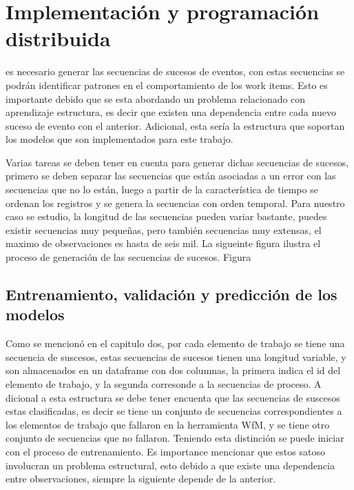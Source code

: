 
\chapter{Implementación y programación distribuida}

\ifpdf
    \graphicspath{{Chapter4/Figs/Raster/}{Chapter4/Figs/PDF/}{Chapter4/Figs/}}
\else
    \graphicspath{{Chapter4/Figs/Vector/}{Chapter4/Figs/}}
\fi


es necesario generar las secuencias de sucesos de eventos, con estas secuencias se podrán identificar patrones en el comportamiento de los work items. Esto es importante debido que se esta abordando un problema relacionado con aprendizaje estructura, es decir que existen una dependencia entre cada nuevo suceso de evento con el anterior. Adicional, esta sería la estructura que soportan los modelos que son implementados para este trabajo.

Varias tareas se deben tener en cuenta para generar dichas secuencias de sucesos, primero se deben separar las secuencias que están asociadas a un error con las secuencias que no lo están, luego a partir de la característica de tiempo se ordenan los registros y se genera la secuencias con orden temporal. Para nuestro caso se estudio, la longitud de las secuencias pueden variar bastante, puedes existir secuencias muy pequeñas, pero también secuencias muy extensas, el maximo de observaciones es hasta de seis mil.
La sigueinte figura ilustra el proceso de generación de las secuencias de sucesos. Figura

\section{Entrenamiento, validación y predicción de los modelos} %
\label{section4.1}

Como se mencionó en el capitulo dos, por cada elemento de trabajo se tiene una secuencia de suscesos, estas secuencias de sucesos tienen una longitud variable, y son almacenados en un dataframe con dos columnas, la primera indica el id del elemento de trabajo, y la segunda corresonde a la secuencias de proceso. A dicional a esta estructura se debe tener encuenta que las secuencias de suscesos estas clasificadas, es decir se tiene un conjunto de secuencias correspondientes a los elementos de trabajo que fallaron en la herramienta WfM, y se tiene otro conjunto de secuencias que no fallaron. Teniendo esta distinción se puede iniciar con el proceso de entrenamiento. Es importance mencionar que estos satoso involucran un problema estructural, esto debido a que existe una dependencia entre observaciones, siempre la siguiente depende de la anterior.

